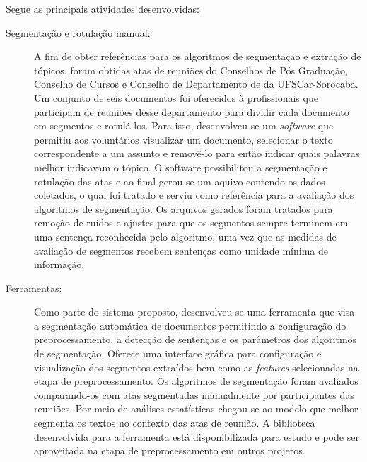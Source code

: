 %

Segue as principais atividades desenvolvidas:

\begin{description}
	
	 
	\item[Segmentação e rotulação manual:] A fim de obter referências para os algoritmos de segmentação e  extração de tópicos, foram obtidas atas de reuniões do Conselhos de Pós Graduação, Conselho de Cursos e Conselho de Departamento de da UFSCar-Sorocaba. Um conjunto de seis documentos foi oferecidos à profissionais que participam de reuniões desse departamento para dividir cada documento em segmentos e rotulá-los. Para isso, desenvolveu-se um \textit{software} que permitiu aos voluntários visualizar um documento, selecionar o texto correspondente a um assunto e removê-lo para então indicar quais palavras melhor indicavam o tópico. O software possibilitou a segmentação e rotulação das atas e ao final gerou-se um aquivo contendo os dados coletados, o qual foi tratado e serviu como referência para a avaliação dos algoritmos de segmentação.
	Os arquivos gerados foram tratados para remoção de ruídos e ajustes para que os segmentos sempre terminem em uma sentença reconhecida pelo algoritmo, uma vez que as medidas de avaliação de segmentos recebem sentenças como unidade mínima de informação.
	
	

	\item[Ferramentas:] Como parte do sistema proposto, desenvolveu-se uma ferramenta que visa a segmentação automática de documentos permitindo a configuração do preprocessamento, a detecção de sentenças e os parâmetros dos algoritmos de segmentação. Oferece uma interface gráfica para configuração e visualização dos segmentos extraídos bem como as \textit{features} selecionadas na etapa de preprocessamento. 
Os algoritmos de segmentação foram avaliados comparando-os com atas segmentadas manualmente por participantes das reuniões. Por meio de análises estatísticas chegou-se ao modelo que melhor segmenta os textos no contexto das atas de reunião. 		
	A biblioteca desenvolvida para a ferramenta está disponibilizada para estudo e pode ser aproveitada na etapa de preprocessamento em outros projetos.


\end{description}
